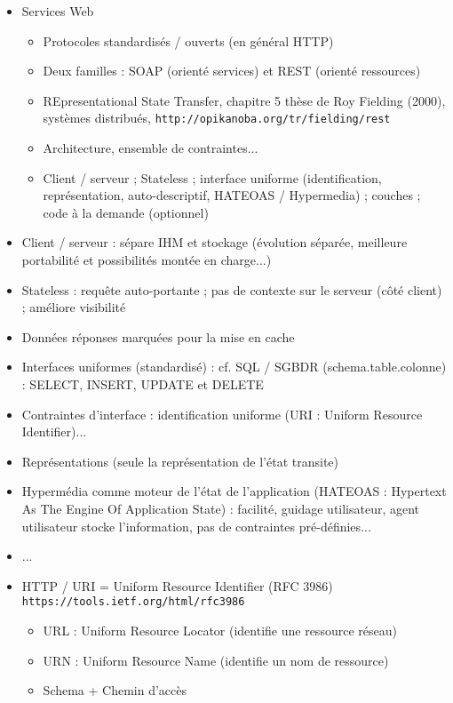 \documentclass[11pt,twoside,a4paper]{article}
\begin{document}
\begin{landscape}
\begin{multicols}{2}
	\begin{itemize}
		\item Services Web
		\begin{itemize}
			\item Protocoles standardis{\'e}s / ouverts (en g{\'e}n{\'e}ral HTTP)
			\item Deux familles : SOAP (orient{\'e} services) et REST (orient{\'e} ressources)
			\item REpresentational State Transfer, chapitre 5 th{\`e}se de Roy Fielding (2000), syst{\`e}mes distribu{\'e}s, \texttt{http://opikanoba.org/tr/fielding/rest}
			\item Architecture, ensemble de contraintes... 
			\item Client / serveur ; Stateless ; interface uniforme (identification, repr{\'e}sentation, auto-descriptif, HATEOAS / Hypermedia) ; couches ; code {\`a} la demande (optionnel)
		\end{itemize}
		\item Client / serveur : s{\'e}pare IHM et stockage ({\'e}volution s{\'e}par{\'e}e, meilleure portabilit{\'e} et possibilit{\'e}s mont{\'e}e en charge...)
		\item Stateless : requ{\^e}te auto-portante ; pas de contexte sur le serveur (c{\^o}t{\'e} client) ; am{\'e}liore visibilit{\'e}
		\item Donn{\'e}es r{\'e}ponses marqu{\'e}es pour la mise en cache
		\item Interfaces uniformes (standardis{\'e}) : cf. SQL / SGBDR (schema.table.colonne) : SELECT, INSERT, UPDATE et DELETE
		\item Contraintes d'interface : identification uniforme (URI : Uniform Resource Identifier)...
		\item Repr{\'e}sentations (seule la repr{\'e}sentation de l'{\'e}tat transite)
		\item Hyperm{\'e}dia comme moteur de l'{\'e}tat de l'application (HATEOAS : Hypertext As The Engine Of Application State) : facilit{\'e}, guidage utilisateur, agent utilisateur stocke l'information, pas de contraintes pr{\'e}-d{\'e}finies...
		\item ...
		\item HTTP / URI = Uniform Resource Identifier (RFC 3986) \texttt{https://tools.ietf.org/html/rfc3986 }
		\begin{itemize}
			\item URL : Uniform Resource Locator (identifie une ressource r{\'e}seau)
			\item URN : Uniform Resource Name (identifie un nom de ressource)
			\item Schema + Chemin d'acc{\`e}s
		\end{itemize}
		

\end{itemize}
\end{multicols}
\end{landscape}
\end{document}
